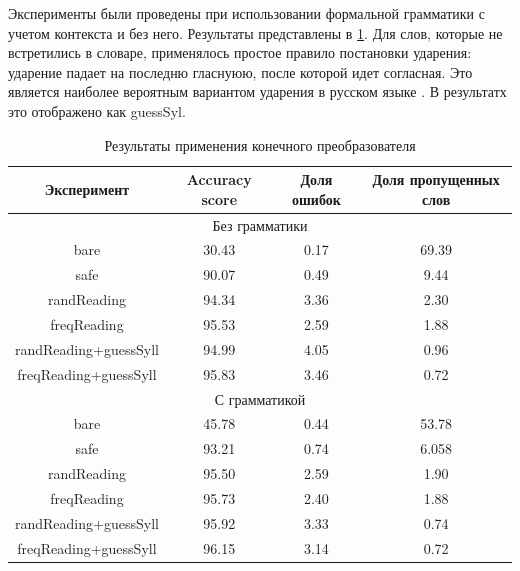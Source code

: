 \documentclass[14pt, a4paper, russian]{extreport}
\begin{document}
Эксперименты были проведены при использовании формальной грамматики с учетом контекста и без него. Результаты представлены в \cref{table:final_state_result}. Для слов, которые не встретились в словаре, применялось простое правило постановки ударения: ударение падает на последню гласнуюю, после которой идет согласная. Это является наиболее вероятным вариантом ударения в русском языке \cite{lavitskaya}. В результатх это отображено как guessSyl.

\begin{table}[H]
	\caption{Результаты применения конечного преобразователя}
	
	\begin{small}
		\begin{center}
			\begin{tabular}{|c|c|c|c|}
				\hline
				     Эксперимент      & Accuracy score & Доля ошибок & Доля пропущенных слов \\ \hline
				\multicolumn{4}{|c|}{Без грамматики}                                         \\ \hline
				        bare          &     30.43      &    0.17     &         69.39         \\ \hline
				        safe          &     90.07      &    0.49     &         9.44          \\ \hline
				     randReading      &     94.34      &    3.36     &         2.30          \\ \hline
				     freqReading      &     95.53      &    2.59     &         1.88          \\ \hline
				randReading+guessSyll &     94.99      &    4.05     &         0.96          \\ \hline
				freqReading+guessSyll &     95.83      &    3.46     &         0.72          \\ \hline
				\multicolumn{4}{|c|}{С грамматикой}                                          \\ \hline
				        bare          &     45.78      &    0.44     &         53.78         \\ \hline
				        safe          &     93.21      &    0.74     &         6.058         \\ \hline
				     randReading      &     95.50      &    2.59     &         1.90          \\ \hline
				     freqReading      &     95.73      &    2.40     &         1.88          \\ \hline
				randReading+guessSyll &     95.92      &    3.33     &         0.74          \\ \hline
				freqReading+guessSyll &     96.15      &    3.14     &         0.72          \\ \hline
			\end{tabular}
		\end{center}
	\end{small}
	\label{table:final_state_result}
	
\end{table}
\end{document}
